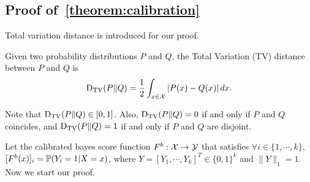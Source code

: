\subsection{Proof of~\cref{theorem:calibration}} \label{proof:calibration}

Total variation distance is introduced for our proof.
\begin{definition} \label{def:tv_distance}
Given two probability distributions $P$ and $Q$, the Total Variation (TV) distance between $P$ and $Q$ is
$$\mathrm{D}_{\mathrm{TV}}(P \| Q)= \frac{1}{2} \int_{x \in \mathcal{X}} \left| P(x)-Q(x) \right| d x.$$
\end{definition}
Note that $\mathrm{D}_{\mathrm{TV}}(P \| Q)\in[0,1]$. Also, $\mathrm{D}_{\mathrm{TV}}(P \| Q)=0$ if and only if $P$ and $Q$ coincides, and $\mathrm{D}_{\mathrm{TV}}(P \| Q)=1$ if and only if $P$ and $Q$ are disjoint.

Let the calibrated bayes score function $F^b: \mathcal{X} \to \mathcal{Y}$ that satisfies $\forall i \in \{1, \cdots, k\}$, $[F^b(x)]_i=\mathbb{P}(Y_i=1|X=x)$, where $Y=[Y_1, \cdots, Y_k]^T \in \{0,1\}^k$ and $\|Y\|_1=1$.
Now we start our proof.



